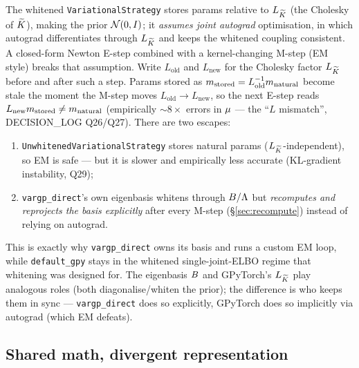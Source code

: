 The whitened \texttt{VariationalStrategy} stores params relative to $L_{\widetilde{K}}$ (the
Cholesky of $\widetilde{K}$), making the prior $\mathcal{N}(0,I)$; it \emph{assumes joint
autograd} optimisation, in which autograd differentiates through $L_{\widetilde{K}}$ and
keeps the whitened coupling consistent. A closed-form Newton E-step combined with
a kernel-changing M-step (EM style) breaks that assumption. Write $L_{\text{old}}$
and $L_{\text{new}}$ for the Cholesky factor $L_{\widetilde{K}}$ before and after such a step.
Params stored as $m_{\text{stored}}=L_{\text{old}}^{-1}m_{\text{natural}}$
become stale the moment the M-step moves $L_{\text{old}}\!\to\!L_{\text{new}}$, so
the next E-step reads $L_{\text{new}}m_{\text{stored}}\neq m_{\text{natural}}$
(empirically $\sim8\times$ errors in $\mu$ --- the ``$L$ mismatch'',
DECISION\_LOG Q26/Q27). There are two escapes:
\begin{enumerate}[nosep]
  \item \texttt{UnwhitenedVariationalStrategy} stores natural params
    ($L_{\widetilde{K}}$-independent), so EM is safe --- but it is slower and empirically
    less accurate (KL-gradient instability, Q29);
  \item \texttt{vargp\_direct}'s own eigenbasis whitens through $B/\Lambda$ but
    \emph{recomputes and reprojects the basis explicitly} after every M-step
    (\S\ref{sec:recompute}) instead of relying on autograd.
\end{enumerate}
This is exactly why \texttt{vargp\_direct} owns its basis and runs a custom EM
loop, while \texttt{default\_gpy} stays in the whitened single-joint-ELBO regime
that whitening was designed for. The eigenbasis $B$ and GPyTorch's $L_{\widetilde{K}}$ play
analogous roles (both diagonalise/whiten the prior); the difference is who keeps
them in sync --- \texttt{vargp\_direct} does so explicitly, GPyTorch does so
implicitly via autograd (which EM defeats).

\subsection{Shared math, divergent representation}\label{sec:contrast}

